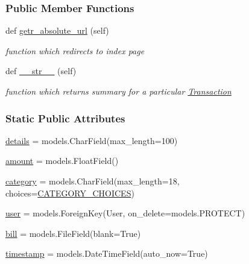\subsubsection*{Public Member Functions}
\begin{DoxyCompactItemize}
\item 
def \hyperlink{classtxn_1_1models_1_1Transaction_a82ad28e5fc95fb68579a7864c2a6b64a}{getr\+\_\+absolute\+\_\+url} (self)
\begin{DoxyCompactList}\small\item\em function which redirects to index page \end{DoxyCompactList}\item 
def \hyperlink{classtxn_1_1models_1_1Transaction_ac893d08a9197f60a0e2161223e568fbe}{\+\_\+\+\_\+str\+\_\+\+\_\+} (self)
\begin{DoxyCompactList}\small\item\em function which returns summary for a particular \hyperlink{classtxn_1_1models_1_1Transaction}{Transaction} \end{DoxyCompactList}\end{DoxyCompactItemize}
\subsubsection*{Static Public Attributes}
\begin{DoxyCompactItemize}
\item 
\hyperlink{classtxn_1_1models_1_1Transaction_aa926787c0c5b0669e6ade3b05c41efe7}{details} = models.\+Char\+Field(max\+\_\+length=100)
\item 
\hyperlink{classtxn_1_1models_1_1Transaction_a2b6b3fb491c248fdffbcb886bb53f83b}{amount} = models.\+Float\+Field()
\item 
\hyperlink{classtxn_1_1models_1_1Transaction_a4af461136da5a2da7fd18be27f23ee5e}{category} = models.\+Char\+Field(max\+\_\+length=18, choices=\hyperlink{namespacetxn_1_1models_a034516542ac27ed16242da9c4bc5b636}{C\+A\+T\+E\+G\+O\+R\+Y\+\_\+\+C\+H\+O\+I\+C\+ES})
\item 
\hyperlink{classtxn_1_1models_1_1Transaction_a4fd6d61980d17b3630202852c28e153c}{user} = models.\+Foreign\+Key(User, on\+\_\+delete=models.\+P\+R\+O\+T\+E\+CT)
\item 
\hyperlink{classtxn_1_1models_1_1Transaction_a6d02b7c7bc3b43dc3306b8e47c21fe1d}{bill} = models.\+File\+Field(blank=True)
\item 
\hyperlink{classtxn_1_1models_1_1Transaction_a0b205579b1b94cd4d764a42812ac9acd}{timestamp} = models.\+Date\+Time\+Field(auto\+\_\+now=True)
\end{DoxyCompactItemize}


